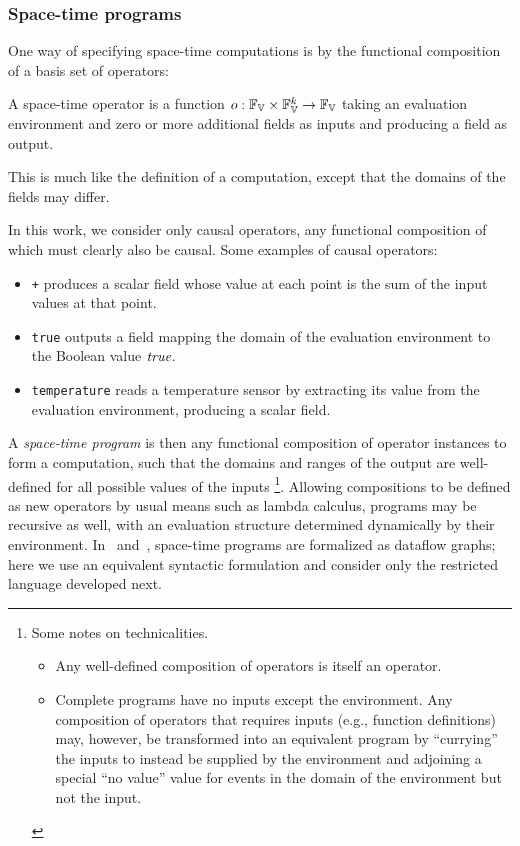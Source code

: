 \documentclass[12pt,a4paper,twoside,openright]{book}
\begin{document}
\subsubsection{Space-time programs}

One way of specifying space-time computations is by the functional composition of a basis set of operators:
%
\begin{thrdefn}\label{def:operator}
A space-time operator is a function 
$o: \fieldsof{\spaceof{\datavalue}} \times \fieldsof{\spaceof{\datavalue}}^k \rightarrow \fieldsof{\spaceof{\datavalue}}$
taking an evaluation environment and zero or more additional fields
as inputs and producing a field as output.
\end{thrdefn}
\noindent
This is much like the definition of a computation, except that the domains of the fields may differ.

In this work, we consider only causal operators, any functional composition of which must clearly also be causal.
%
Some examples of causal operators:
\begin{itemize}
\item {\tt +} produces a scalar field whose value at each point is the sum of the input values at that point.
\item {\tt true} outputs a field mapping the domain of the evaluation environment to the Boolean value $\textit{true}$.
\item {\tt temperature} reads a temperature sensor by extracting its value from the evaluation environment, producing a scalar field.
\end{itemize}

A {\em space-time program} is then any functional composition of operator instances to form a computation, such that the domains and ranges of the output are well-defined for all possible values of the inputs
\footnote{Some notes on technicalities.
	\begin{itemize}
		\item Any well-defined composition of operators is itself an operator.
		\item Complete programs have no inputs except the environment.  Any composition of operators that requires inputs (e.g., function definitions) may, however, be transformed into an equivalent program by ``currying'' the inputs to instead be supplied by the environment and adjoining a special ``no value'' value for events in the domain of the environment but not the input.
	\end{itemize}
}.
%
Allowing compositions to be defined as new operators by usual means such as lambda calculus, programs may be recursive as well, with an evaluation structure determined dynamically by their environment.
%
In~\cite{BealUsbeck12} and~\cite{BVD-SCW14}, space-time programs are formalized as dataflow graphs; here we use an equivalent syntactic formulation and consider only the restricted language developed next.
\end{document}
